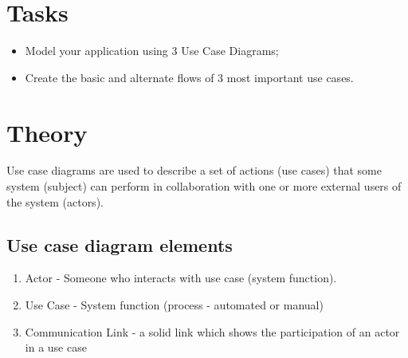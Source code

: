 \documentclass[12pt,a4paper,titlepage]{article}
\begin{document}
\section{Tasks}
\begin{itemize}
	\item
	Model your application using 3 Use Case Diagrams;
	\item 
	Create the basic and alternate flows of 3 most important use cases.
\end{itemize}

\section{Theory}
Use case diagrams are used to describe a set of actions (use cases) that some system (subject) can perform in collaboration with one or more external users of the system (actors).

\subsection{Use case diagram elements}
\begin{enumerate}  
	\item Actor - Someone who interacts with use case (system function).
	\item Use Case - System function (process - automated or manual)
	\item Communication Link - a solid link which shows the participation of an actor in a use case 
\end{enumerate}
\end{document}
